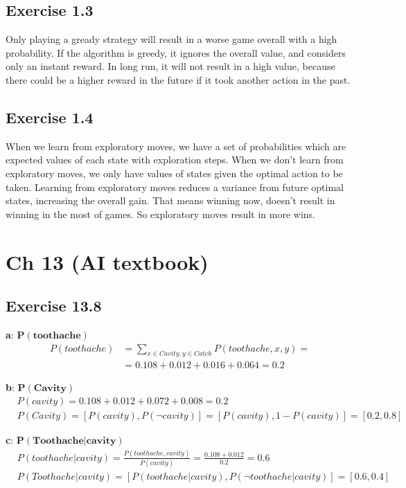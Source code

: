 \documentclass[12pt, a4paper]{article}
\begin{document}
        \subsection{Exercise 1.3}
            Only playing a gready strategy will result in a worse game overall with a high probability. If the algorithm is greedy, it ignores the overall value, and considers only an instant reward. In long run, it will not result in a high value, because there could be a higher reward in the future if it took another action in the past.

        \subsection{Exercise 1.4}
            When we learn from exploratory moves, we have a set of probabilities which are expected values of each state with exploration steps. When we don't learn from exploratory moves, we only have values of states given the optimal action to be taken. Learning from exploratory moves reduces a variance from future optimal states, increasing the overall gain. That means winning now, doesn't result in winning in the most of games. So exploratory moves result in more wins.

    \section{Ch 13 (AI textbook)}

        \subsection{Exercise 13.8}
            \textbf{a}: $\bm{P(toothache)}$
            \begin{align*}
                P(toothache) &= \sum\limits_{x \in Cavity, y \in Catch} P(toothache, x, y) =\\
                &= 0.108 + 0.012 + 0.016 + 0.064 = 0.2
            \end{align*}

            \textbf{b}: $\bm{P(Cavity)}$
            \begin{align*}
                &P(cavity) = 0.108 + 0.012 + 0.072 + 0.008 = 0.2 \\
                &P(Cavity) = [P(cavity), P(\neg cavity)] = [P(cavity), 1 - P(cavity)] = [0.2, 0.8]
            \end{align*}

            \textbf{c}: $\bm{P(Toothache|cavity)}$
            \begin{align*}
                &P(toothache|cavity) = \frac{P(toothache, cavity)}{P(cavity)} = \frac{0.108 + 0.012}{0.2} = 0.6 \\
                &P(Toothache|cavity) = [P(toothache|cavity), P(\neg toothache|cavity)] = [0.6, 0.4]
            \end{align*}
\end{document}
